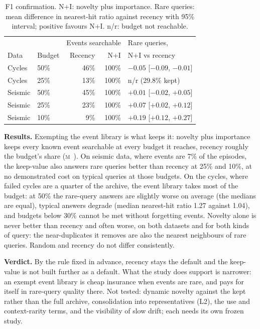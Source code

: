 \documentclass[sigconf,nonacm]{acmart}
\newcommand{\meas}{\textsc{m}}
\begin{document}
\begin{table}[t]
\caption{F1 confirmation. N+I: novelty plus importance. Rare queries: mean difference in nearest-hit ratio against recency with 95\% interval; positive favours N+I. n/r: budget not reachable.}
\label{tab:f1}
\small
\begin{tabularx}{\columnwidth}{@{}llrrX@{}}
\toprule
& & \multicolumn{2}{c}{Events searchable} & Rare queries, \\
Data & Budget & Recency & N+I & N+I vs recency \\
\midrule
Cycles & 50\% & 46\% & 100\% & $-0.05$ [$-0.09$, $-0.01$] \\
Cycles & 25\% & 13\% & 100\% & n/r (29.8\% kept) \\
Seismic & 50\% & 45\% & 100\% & $+0.01$ [$-0.02$, $+0.05$] \\
Seismic & 25\% & 23\% & 100\% & $+0.07$ [$+0.02$, $+0.12$] \\
Seismic & 10\% & 9\% & 100\% & $+0.19$ [$+0.12$, $+0.27$] \\
\end{tabularx}
\end{table}

\textbf{Results.} Exempting the event library is what keeps it: novelty plus importance keeps every known event searchable at every budget it reaches, recency roughly the budget's share (\meas{}~\cite{f1}). On seismic data, where events are 7\% of the episodes, the keep-value also answers rare queries better than recency at 25\% and 10\%, at no demonstrated cost on typical queries at those budgets. On the cycles, where failed cycles are a quarter of the archive, the event library takes most of the budget: at 50\% the rare-query answers are slightly worse on average (the medians are equal), typical answers degrade (median nearest-hit ratio 1.27 against 1.04), and budgets below 30\% cannot be met without forgetting events. Novelty alone is never better than recency and often worse, on both datasets and for both kinds of query: the near-duplicates it removes are also the nearest neighbours of rare queries. Random and recency do not differ consistently.

\textbf{Verdict.} By the rule fixed in advance, recency stays the default and the keep-value is not built further as a default. What the study does support is narrower: an exempt event library is cheap insurance when events are rare, and pays for itself in rare-query quality there. Not tested: dynamic novelty against the kept rather than the full archive, consolidation into representatives (L2), the use and context-rarity terms, and the visibility of slow drift; each needs its own frozen study.
\end{document}
